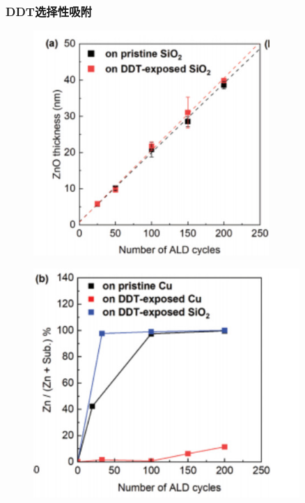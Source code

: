 \documentclass[UTF8,a4paper,12pt]{ctexart}%
\begin{document}
\subsubsection{DDT选择性吸附}


\begin{figure}[htb]
	\centering
	\begin{minipage}[t]{0.3\textwidth}
	\centering
	\includegraphics[width=0.8\textwidth]{10.jpg}
	\label{Fig:10}
	\end{minipage}
	\begin{minipage}[t]{0.3\textwidth}
	\centering
	\includegraphics[width=0.9\textwidth]{11.jpg}
	\label{Fig:11}
	\end{minipage}

\end{figure}
\end{document}
